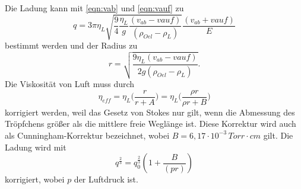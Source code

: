 Die Ladung kann mit \autoref{eqn:vab} und \autoref{eqn:vauf} zu
\begin{equation}
   q = 3 \pi \eta_L \sqrt{\frac{9}{4} \frac{\eta_L}{g} \frac{(v_{ab}-v{auf})}{(\rho_{Oel}-\rho_L)}} \frac{(v_{ab}+v{auf})}{E}
    \label{eqn:Ladung}
\end{equation}
bestimmt werden und der Radius zu
\begin{equation}
    r = \sqrt{\frac{9 \eta_L (v_{ab}-v{auf})}{2 g (\rho_{Oel}-\rho_L)}}.
    \label{eqn:Radius}
\end{equation}
Die Viskosität von Luft muss durch 
\begin{equation}
    \eta_{eff} = \eta_L \Biggl(\frac{r}{r + A}\Biggr) = \eta_L \Biggl(\frac{\rho r}{\rho r + B}\Biggr)
    \label{eqn:eta_kor}
\end{equation}
korrigiert werden, weil das Gesetz von Stokes nur gilt, wenn die Abmessung des Tröpfchens größer als die mittlere
freie Weglänge ist. Diese Korrektur wird auch als Cunningham-Korrektur bezeichnet, wobei $B = 6,17 \cdot 10^{-3}\,  Torr \cdot cm$ gilt.
Die Ladung wird mit 
\begin{equation}
    q^{\frac{2}{3}} = q^{\frac{2}{3}}_0 (1 + \frac{B}{(p r)})
    \label{eqn:Ladung_kor}
\end{equation}
korrigiert, wobei $p$ der Luftdruck ist.